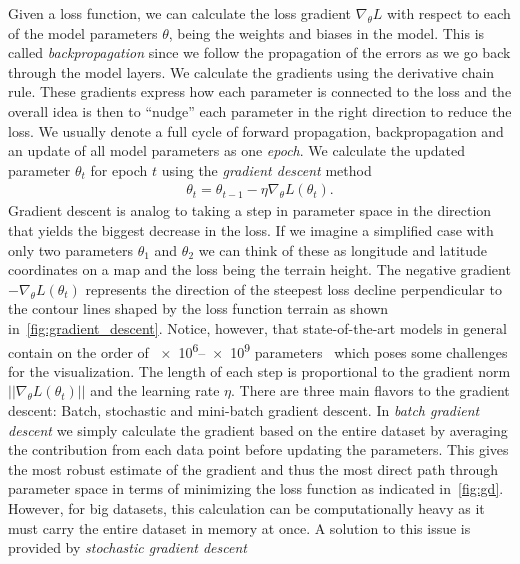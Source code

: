 Given a loss function, we can calculate the loss gradient $\nabla_\theta L$ with respect to each of the model parameters $\theta$, being the weights and biases in the model. This is called \textit{backpropagation} since we follow the propagation of the errors as we go back through the model layers. We calculate the gradients using the derivative chain rule. These gradients express how each parameter is connected to the loss and the overall idea is then to ``nudge'' each parameter in the right direction to reduce the loss. We usually denote a full cycle of forward propagation, backpropagation and an update of all model parameters as one \textit{epoch}. We calculate the updated parameter $\theta_t$ for epoch $t$ using the \textit{gradient descent} method
\begin{align}
  \theta_{t} = \theta_{t-1} - \eta \nabla_\theta L(\theta_t).
  \label{eq:grad_descent}
\end{align}
Gradient descent is analog to taking a step in parameter space in the direction
that yields the biggest decrease in the loss. If we imagine a simplified case
with only two parameters $\theta_1$ and $\theta_2$ we can think of these as longitude and latitude coordinates on a map and the loss being the terrain height. The negative gradient $-\nabla_\theta L(\theta_t)$ represents the direction of the steepest loss decline perpendicular to the contour lines shaped by the loss function terrain as shown in~\cref{fig:gradient_descent}. Notice, however, that state-of-the-art models in general contain on the order of \num{e6}--\num{e9} parameters~\cite{thompson2022computational} which poses some challenges for the visualization.  The length of each step is proportional to the gradient norm $||\nabla_\theta L(\theta_t)||$ and the learning rate $\eta$. There are three main flavors to the gradient descent: Batch,
stochastic and mini-batch gradient descent. In \textit{batch gradient descent} we simply
calculate the gradient based on the entire dataset by averaging the contribution
from each data point before updating the parameters. This gives the most robust estimate of the gradient and thus the most direct path through parameter space in terms of minimizing the loss function as
indicated in~\cref{fig:gd}. However, for big datasets, this calculation can be
computationally heavy as it must carry the entire dataset in memory at once. A
solution to this issue is provided by \textit{stochastic gradient descent}
